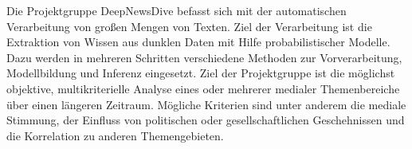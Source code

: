 Die Projektgruppe DeepNewsDive befasst sich mit der automatischen Verarbeitung von großen Mengen von Texten. Ziel der Verarbeitung ist die Extraktion von Wissen aus dunklen Daten mit Hilfe probabilistischer Modelle. Dazu werden in mehreren Schritten verschiedene Methoden zur Vorverarbeitung, Modellbildung und Inferenz eingesetzt. Ziel der Projektgruppe ist die möglichst objektive, multikriterielle Analyse eines oder mehrerer medialer Themenbereiche über einen längeren Zeitraum. Mögliche Kriterien sind unter anderem die mediale Stimmung, der Einfluss von politischen oder gesellschaftlichen Geschehnissen und die Korrelation zu anderen Themengebieten.

